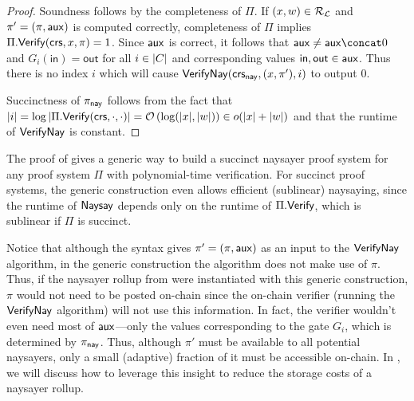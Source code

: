 \begin{proof}
Soundness follows by the completeness of $\Pi$. If $(x,w) \in \mathcal{R}_{\mathcal{L}}$ and $\pi' = (\pi, \mathsf{aux})$ is computed correctly, completeness of $\Pi$ implies $\Pi.\mathsf{Verify}(\mathsf{crs}, x, \pi) = 1$. Since $\mathsf{aux}$ is correct, it follows that $\aux \neq \aux \concat 0$ and $G_i(\mathsf{in}) = \mathsf{out}$ for all $i \in \lvert C \rvert$ and corresponding values $\mathsf{in},\mathsf{out} \in \mathsf{aux}$. Thus there is no index $i$ which will cause ${\mathsf{Verify}}\mathsf{Nay}(\mathsf{crs}_{\mathsf{nay}}, (x, \pi'), i)$ to output 0.

Succinctness of $\pi_{\mathsf{nay}}$ follows from the fact that $\lvert i \rvert = \log{\lvert \Pi.\ensuremath{\mathsf{Verify}}(\ensuremath{\mathsf{crs}}, \cdot, \cdot) \rvert} = 
\mathcal{O}\left(\log(\lvert x \rvert, \lvert w \rvert)\right) \in o(\lvert x \rvert + \lvert w \rvert)$ and that the runtime of ${\mathsf{Verify}}\mathsf{Nay}$ is constant.
\end{proof}

The proof of  gives a generic way to build a succinct naysayer proof system for any proof system $\Pi$ with polynomial-time verification. For succinct proof systems, the generic construction even allows efficient (sublinear) naysaying, since the runtime of $\mathsf{Naysay}$ depends only on the runtime of $\Pi.\mathsf{Verify}$, which is sublinear if $\Pi$ is succinct.

Notice that although the syntax gives $\pi' = (\pi, \mathsf{aux})$ as an input to the ${\mathsf{Verify}}\mathsf{Nay}$ algorithm, in the generic construction the algorithm does not make use of $\pi$. Thus, if the naysayer rollup from  were instantiated with this generic construction, $\pi$ would not need to be posted on-chain since the on-chain verifier (running the ${\mathsf{Verify}}\mathsf{Nay}$ algorithm) will not use this information. In fact, the verifier wouldn't even need most of $\mathsf{aux}$---only the values corresponding to the gate $G_i$, which is determined by $\pi_{\mathsf{nay}}$. Thus, although $\pi'$ must be available to all potential naysayers, only a small (adaptive) fraction of it must be accessible on-chain. In , we will discuss how to leverage this insight to reduce the storage costs of a naysayer rollup. 

